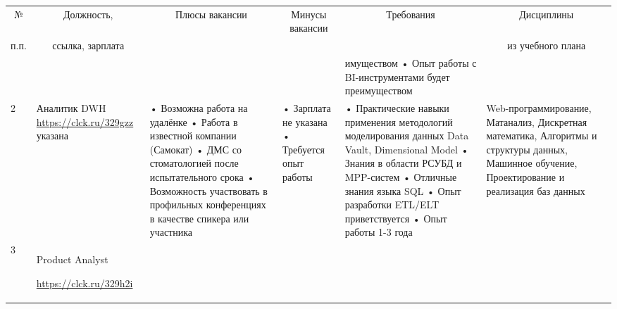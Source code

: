 \begin{landscape}
\begin{table}[H]
	\begin{center}
		\begin{small}
		\begin{tabular}{|p{0.1cm}|p{5cm}|p{4.5cm}|p{4.5cm}|p{4cm}|p{3cm}|} \hline
			\multicolumn{1}{|c|}{№}&\multicolumn{1}{c|}{Должность,}&\multicolumn{1}{c|}{Плюсы вакансии}&\multicolumn{1}{c|}{Минусы вакансии}&\multicolumn{1}{c|}{Требования}&\multicolumn{1}{c|}{Дисциплины}\\ 
			\multicolumn{1}{|c|}{п.п.}&\multicolumn{1}{c|}{ссылка, зарплата}&\multicolumn{1}{c|}{}&\multicolumn{1}{c|}{}&\multicolumn{1}{c|}{}&\multicolumn{1}{c|}{из учебного плана}\\ 
			\hline
			&
			&
			&
			&
			имуществом
			\newline• Опыт работы с BI-инструментами будет преимуществом
			&
			\\
			\hline
			2 & Аналитик DWH
			\newline\url{https://clck.ru/329gzz}
			 указана
			&
			• Возможна работа на удалёнке
			\newline• Работа в известной компании (Самокат)
			\newline• ДМС со стоматологией после испытательного срока
			\newline• Возможность участвовать в профильных конференциях в качестве спикера или участника
			&
			• Зарплата не указана
			\newline• Требуется опыт работы
			&
			• Практические навыки применения методологий моделирования данных Data Vault, Dimensional Model
			\newline• Знания в области РСУБД и MPP-систем
			\newline• Отличные знания языка SQL
			\newline• Опыт разработки ETL/ELT приветствуется
			\newline• Опыт работы 1-3 года
			&
			Web-программирование, Матанализ, Дискретная математика, Алгоритмы и структуры данных, Машинное обучение, Проектирование и реализация баз данных
			\\
			\hline
			3 & Product Analyst
				
			\url{https://clck.ru/329h2i}
				

\end{tabular}
\end{small}
\end{center}
\end{table}
\end{landscape}
